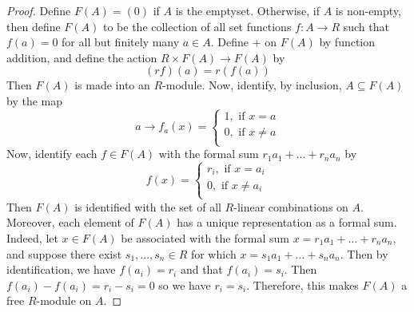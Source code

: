 \begin{proof}
  Define $F(A)=(0)$ if $A$ is the emptyset. Otherwise, if $A$ is
  non-empty, then define $F(A)$ to be the collection of all set
  functions $f:A \xrightarrow{} R$ such that $f(a)=0$ for all but
  finitely many $a \in A$. Define $+$ on $F(A)$ by function addition,
  and define the action $R \times F(A) \xrightarrow{} F(A)$ by
  \begin{equation*}
    (rf)(a)=r(f(a))
  \end{equation*}
  Then $F(A)$ is made into an $R$-module. Now, identify, by inclusion,
  $A \subseteq F(A)$ by the map
  \begin{equation*}
    a \xrightarrow{} f_a(x)=
    \begin{cases}
      1, \text{ if } x=a  \\
      0, \text{ if } x \neq a \\
    \end{cases}
  \end{equation*}
  Now, identify each $f \in F(A)$ with the formal sum
  $r_1a_1+\dots+r_na_n$ by
  \begin{equation*}
    f(x)=
    \begin{cases}
      r_i, \text{ if } x=a_i  \\
      0 , \text{ if } x \neq a_i  \\
    \end{cases}
  \end{equation*}
  Then $F(A)$ is identified with the set of all $R$-linear
  combinations on $A$. Moreover, each element of $F(A)$ has a unique
  representation as a formal sum. Indeed, let $x \in F(A)$ be
  associated with the formal sum $x=r_1a_1+\dots+r_na_n$, and suppose
  there exist $s_1, \dots, s_n \in R$ for which
  $x=s_1a_1+\dots+s_na_n$. Then by identification, we have
  $f(a_i)=r_i$ and that $f(a_i)=s_i$. Then $f(a_i)-f(a_i)=r_i-s_i=0$
  so we have $r_i=s_i$. Therefore, this makes $F(A)$ a free $R$-module
  on  $A$.


\end{proof}
